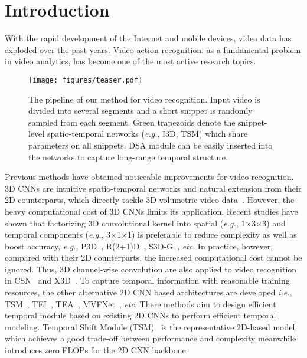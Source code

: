 \documentclass[sigconf]{acmart}
\def\x{$\times$}
\begin{document}





\maketitle






\section{Introduction}



  
With the rapid development of the Internet and mobile devices, video data has exploded over the past years. Video action recognition, as a fundamental problem in video analytics, has become one of the most active research topics. 
\begin{figure}[t]
    \centering
    \texttt{[image: figures/teaser.pdf]}
    \caption{
    The pipeline of our method for video recognition. Input video is divided into several segments and a short snippet is randomly sampled from each segment. Green trapezoids denote the snippet-level spatio-temporal networks (\emph{e.g.}, I3D, TSM) which share parameters on all snippets. DSA module can be easily inserted into the networks to capture long-range temporal structure.
    }
    \label{fig:overview}
\end{figure} 
Previous methods have obtained noticeable improvements for video recognition.
3D CNNs are intuitive spatio-temporal networks and natural extension from their 2D counterparts, which directly tackle 3D volumetric video data~\cite{c3d,i3d}. However, the heavy computational cost of 3D CNNs limits its application. Recent studies have shown that factorizing 3D convolutional kernel into spatial (\emph{e.g.}, 1\x3\x3) and temporal components (\emph{e.g.}, 3\x1\x1) is preferable to reduce complexity as well as boost accuracy, \emph{e.g.}, P3D~\cite{p3d}, R(2+1)D~\cite{r2+1d}, S3D-G~\cite{s3d}, \emph{etc}. 
In practice, however, compared with their 2D counterparts, the increased computational cost cannot be ignored.
Thus, 3D channel-wise convolution are also applied to video recognition in CSN~\cite{CSN} and X3D~\cite{feichtenhofer2020x3d}.
To capture temporal information with reasonable training resources, the other alternative 2D CNN based architectures are developed \emph{i.e.,} TSM~\cite{tsm}, TEI~\cite{teinet}, TEA~\cite{li2020tea}, MVFNet~\cite{wu2020MVFNet}, \emph{etc}. There methods aim to design efficient temporal module based on existing 2D CNNs to perform efficient temporal modeling.
Temporal Shift Module (TSM)~\cite{tsm} is the representative 2D-based model, which achieves a good trade-off between performance and complexity meanwhile introduces zero FLOPs for the 2D CNN backbone. 
\end{document}
